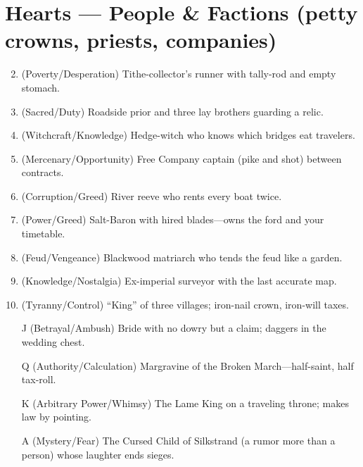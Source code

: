 \section*{Hearts --- People \& Factions (petty crowns, priests, companies)}
\label{sec:acasia-people}
\begin{enumerate}
\setcounter{enumi}{1}
\item (Poverty/Desperation) Tithe-collector's runner with tally-rod and empty stomach.
\item (Sacred/Duty) Roadside prior and three lay brothers guarding a relic.
\item (Witchcraft/Knowledge) Hedge-witch who knows which bridges eat travelers.
\item (Mercenary/Opportunity) Free Company captain (pike and shot) between contracts.
\item (Corruption/Greed) River reeve who rents every boat twice.
\item (Power/Greed) Salt-Baron with hired blades---owns the ford and your timetable.
\item (Feud/Vengeance) Blackwood matriarch who tends the feud like a garden.
\item (Knowledge/Nostalgia) Ex-imperial surveyor with the last accurate map.
\item (Tyranny/Control) ``King'' of three villages; iron-nail crown, iron-will taxes.
\item[J] (Betrayal/Ambush) Bride with no dowry but a claim; daggers in the wedding chest.
\item[Q] (Authority/Calculation) Margravine of the Broken March---half-saint, half tax-roll.
\item[K] (Arbitrary Power/Whimsy) The Lame King on a traveling throne; makes law by pointing.
\item[A] (Mystery/Fear) The Cursed Child of Silkstrand (a rumor more than a person) whose laughter ends sieges.
\end{enumerate}

